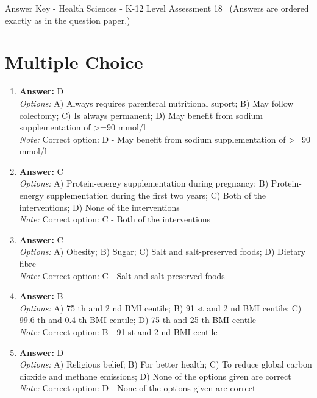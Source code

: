 \documentclass[12pt]{article}
\begin{document}
\begin{center}
Answer Key - Health Sciences - K-12 Level Assessment 18 \
\small (Answers are ordered exactly as in the question paper.)
\end{center}

\section*{Multiple Choice}
\begin{enumerate}[label=\arabic*.]
\item \textbf{Answer:} D
\\ \textit{Options:} A) Always requires parenteral nutritional suport; B) May follow colectomy; C) Is always permanent; D) May benefit from sodium supplementation of \textgreater{}=90 mmol/l
\\ \textit{Note:} Correct option: D - May benefit from sodium supplementation of \textgreater{}=90 mmol/l
\item \textbf{Answer:} C
\\ \textit{Options:} A) Protein-energy supplementation during pregnancy; B) Protein-energy supplementation during the first two years; C) Both of the interventions; D) None of the interventions
\\ \textit{Note:} Correct option: C - Both of the interventions
\item \textbf{Answer:} C
\\ \textit{Options:} A) Obesity; B) Sugar; C) Salt and salt-preserved foods; D) Dietary fibre
\\ \textit{Note:} Correct option: C - Salt and salt-preserved foods
\item \textbf{Answer:} B
\\ \textit{Options:} A) 75 th and 2 nd BMI centile; B) 91 st and 2 nd BMI centile; C) 99.6 th and 0.4 th BMI centile; D) 75 th and 25 th BMI centile
\\ \textit{Note:} Correct option: B - 91 st and 2 nd BMI centile
\item \textbf{Answer:} D
\\ \textit{Options:} A) Religious belief; B) For better health; C) To reduce global carbon dioxide and methane emissions; D) None of the options given are correct
\\ \textit{Note:} Correct option: D - None of the options given are correct
\end{enumerate}
\end{document}
